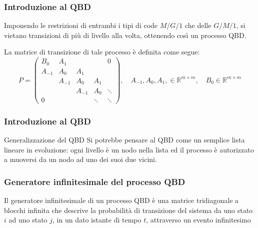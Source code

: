 \documentclass{beamer}
\begin{document}
\begin{frame}
    \frametitle{Introduzione al QBD}

    \begin{block}{}
        Imponendo le restrizioni di entrambi i tipi di code $M/G/1$ che delle $G/M/1$, si vietano transizioni di più di livello alla volta, ottenendo così un processo QBD.
    \end{block}
    La matrice di transizione di tale processo è definita come segue:
    \begin{equation*}
        P=
        \begin{pmatrix}
            B_0 & A_1 & & & 0 \\
            A_{-1} & A_0 & A_1 & & \\
            & A_{-1} & A_0 & A_1 & \\
            & & A_{-1} & A_0 & \ddots \\
            0 & & & \ddots & \ddots
        \end{pmatrix}
        ,\quad A_{-1}, A_0, A_1, \in \mathbb{R}^{m \times m}, \quad B_0 \in \mathbb{R}^{m \times m}
    \end{equation*}

\end{frame}


\begin{frame}
    \frametitle{Introduzione al QBD}
    \begin{block}{Generalizzazione del QBD}
        Si potrebbe pensare al QBD come un semplice lista lineare in evoluzione: ogni livello è un nodo nella lista ed il processo è autorizzato a muoversi da un nodo ad uno dei suoi due vicini.
    \end{block}
\end{frame}

\begin{frame}
    \frametitle{Generatore infinitesimale del processo QBD}
    \begin{block}{}
        Il generatore infinitesimale di un processo QBD è una matrice tridiagonale a blocchi infinita che descrive la probabilità di transizione del sistema da uno stato $i$ ad uno stato $j$, in un dato istante di tempo $t$, attraverso un evento infinitesimo
    \end{block}
\end{frame}
\end{document}
